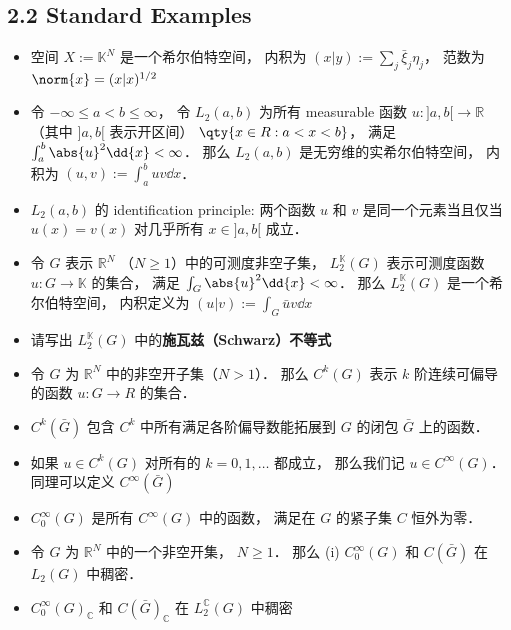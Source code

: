\subsection{2.2 Standard Examples}

\begin{itemize}
\item 空间 $X := \mathbb K^N$ 是一个希尔伯特空间， 内积为 $(x|y) := \sum_j \bar \xi_j \eta_j$， 范数为 $\norm{x} = (x|x)^{1/2}$

\item 令 $-\infty \leqslant a < b \leqslant \infty$， 令 $L_2(a, b)$ 为所有 measurable 函数 $u :]a, b[ \to \mathbb R$（其中 $]a, b[$ 表示开区间） $\qty{x \in R : a < x < b}$， 满足 $\int_a^b \abs{u}^2 \dd{x} < \infty$． 那么 $L_2(a, b)$ 是无穷维的实希尔伯特空间， 内积为 $(u, v) := \int_a^b uv \dd{x}$．

\item $L_2(a, b)$ 的 identification principle: 两个函数 $u$ 和 $v$ 是同一个元素当且仅当 $u(x) = v(x)$ 对几乎所有 $x \in ]a, b[$ 成立．

\item 令 $G$ 表示 $\mathbb R^N$ （$N \geqslant 1$）中的可测度非空子集， $L_2^{\mathbb K}(G)$ 表示可测度函数 $u: G \to \mathbb K$ 的集合， 满足 $\int_G \abs{u}^2 \dd{x} < \infty$． 那么 $L_2^{\mathbb K}(G)$ 是一个希尔伯特空间， 内积定义为 $(u|v) := \int_G \bar u v \dd{x}$

\item 请写出 $L_2^{\mathbb K}(G)$ 中的\textbf{施瓦兹（Schwarz）不等式}

\item 令 $G$ 为 $\mathbb R^N$ 中的非空开子集（$N > 1$）． 那么 $C^k(G)$ 表示 $k$ 阶连续可偏导的函数 $u: G \to R$ 的集合．

\item $C^k(\bar G)$ 包含 $C^k$ 中所有满足各阶偏导数能拓展到 $G$ 的闭包 $\bar G$ 上的函数．

\item 如果 $u \in C^k(G)$ 对所有的 $k = 0, 1, \dots$ 都成立， 那么我们记 $u \in C^\infty(G)$． 同理可以定义 $C^\infty(\bar G)$

\item $C_0^\infty (G)$ 是所有 $C^\infty(G)$ 中的函数， 满足在 $G$ 的紧子集 $C$ 恒外为零．

\item 令 $G$ 为 $\mathbb R^N$ 中的一个非空开集， $N \geqslant 1$． 那么 (i) $C_0^\infty(G)$ 和 $C(\bar G)$ 在 $L_2(G)$ 中稠密．

\item $C_0^\infty(G)_{\mathbb C}$ 和 $C(\bar G)_{\mathbb C}$  在 $L_2^{\mathbb C}(G)$ 中稠密
\end{itemize}

